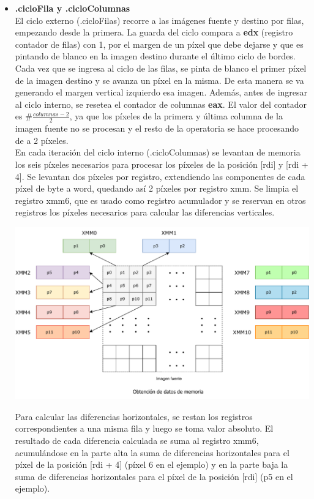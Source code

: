 \documentclass[a4paper]{article}
\begin{document}
\begin{itemize}
	\item \textbf{.cicloFila y .cicloColumnas}\\
	El ciclo externo (.cicloFilas) recorre a las imágenes fuente y destino por filas, empezando desde la primera. La guarda del ciclo compara a \textbf{edx} (registro contador de filas) con 1, por el margen de un píxel que debe dejarse y que es pintando de blanco en la imagen destino durante el último ciclo de bordes. Cada vez que se ingresa al ciclo de las filas, se pinta de blanco el primer píxel de la imagen destino y se avanza un píxel en la misma. De esta manera se va generando el margen vertical izquierdo esa imagen. Además, antes de ingresar al ciclo interno, se resetea el contador de columnas \textbf{eax}. El valor del contador es $\#\frac{columnas-2}{2}$, ya que los píxeles de la primera y última columna de la imagen fuente no se procesan y 
	el resto de la operatoria se hace procesando de a 2 píxeles.\\
	En cada iteración del ciclo interno (.cicloColumnas) se levantan de memoria los seis píxeles necesarios para procesar los píxeles de la posición [rdi] y [rdi + 4]. Se levantan dos píxeles por registro, extendiendo las componentes de cada píxel de byte a word, quedando así 2 píxeles por registro xmm. Se limpia el registro xmm6, que es usado como registro acumulador y se reservan en otros registros los píxeles necesarios para calcular las diferencias verticales.
	\begin{center}
		\includegraphics[scale=0.6]{img/LevColorBordes.pdf}
	\end{center}
	
	Para calcular las diferencias horizontales, se restan los registros correspondientes a una misma fila y luego se toma valor absoluto. El resultado de cada diferencia calculada se suma al registro xmm6, acumulándose en la parte alta la suma de diferencias horizontales para el píxel de la posición [rdi + 4] (píxel 6 en el ejemplo) y en la parte baja la suma de diferencias horizontales para el píxel de la posición [rdi] (p5 en el ejemplo).
	

\end{itemize}
\end{document}
